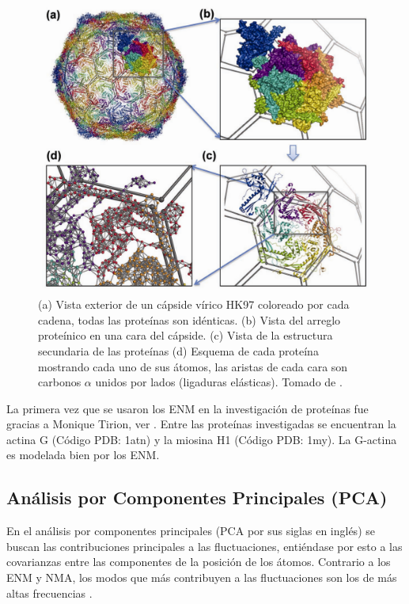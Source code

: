 \begin{figure}
\centering%
\includegraphics[scale=0.3]{Kap2/dibujo.pdf}%
\caption{ (a) Vista exterior de un c\'{a}pside v\'{i}rico HK97 coloreado por cada cadena, todas las prote\'{i}nas son id\'{e}nticas. (b) Vista del arreglo prote\'{i}nico en una cara del c\'{a}pside. (c) Vista de la estructura secundaria de las prote\'{i}nas (d) Esquema de cada prote\'{i}na mostrando cada uno de sus \'{a}tomos, las aristas de cada cara son carbonos $\alpha$ unidos por lados (ligaduras el\'{a}sticas). Tomado de \cite{Lezon2009}.} \label{fig:pan}
\end{figure}

La primera vez que se usaron los ENM en la investigaci\'{o}n de prote\'{i}nas fue gracias a Monique Tirion, ver \cite{Tirion1996}. Entre las prote\'{i}nas  investigadas se encuentran la actina G (C\'{o}digo PDB: 1atn) y la miosina H1 (C\'{o}digo PDB: 1my). La G-actina es modelada bien por los ENM.\\ 
\subsection{An\'{a}lisis por Componentes Principales (PCA)}
En el an\'{a}lisis por componentes principales (PCA por sus siglas en ingl\'{e}s) se buscan las contribuciones principales a las fluctuaciones, enti\'{e}ndase por esto a las covarianzas entre las componentes de la posici\'{o}n de los \'{a}tomos. Contrario a los ENM y NMA, los modos que m\'{a}s contribuyen a las fluctuaciones son los de m\'{a}s altas frecuencias \cite{Amadei1993}.
